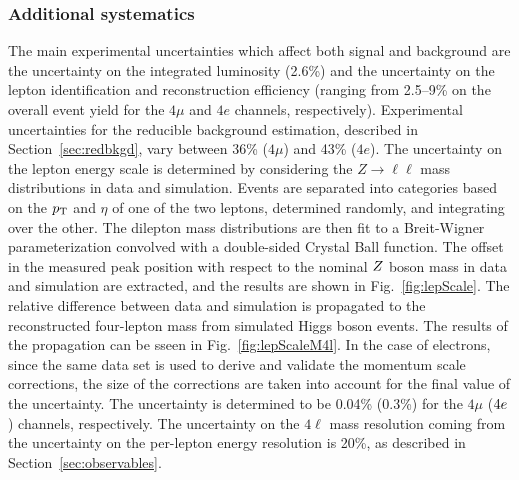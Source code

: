 \subsubsection{Additional systematics}

The main experimental uncertainties which affect both signal and background are the uncertainty on the integrated luminosity
(2.6\%) and the uncertainty on the lepton identification and reconstruction efficiency (ranging from 2.5--9\% on the 
overall event yield for the $4\mu$ 
and $4e$ channels, respectively). Experimental uncertainties for the reducible background estimation, 
described in Section~\ref{sec:redbkgd},
vary between 36\% ($4\mu$)  and 43\% ($4e$).  The uncertainty on the lepton energy scale is determined by considering the 
$Z\rightarrow\ell\ell$ mass distributions in data and simulation. Events are separated into categories based on the 
$p_{\rm{T}}$ and $\eta$ of one of the two leptons, determined randomly, and integrating over the other. The dilepton mass 
distributions are then fit to a Breit-Wigner 
parameterization convolved with a double-sided Crystal Ball function. The offset in the measured peak position with 
respect to the nominal $Z$ boson 
mass in data and simulation are extracted, and the results are shown in Fig.~\ref{fig:lepScale}. The relative difference 
between data and simulation is propagated to the reconstructed four-lepton mass 
from simulated Higgs boson events. The results of the propagation can be sseen in Fig.~\ref{fig:lepScaleM4l}.
In the case of electrons, since the same data set is used to derive and validate the 
momentum scale corrections, the size 
of the corrections are taken into account for the final value of the uncertainty.
The uncertainty is determined to be 0.04\% (0.3\%) for the  $4\mu$ ($4e$) channels, respectively. The uncertainty 
on the $4\ell$ mass resolution coming from the uncertainty on the per-lepton energy resolution is 20\%, 
as described in Section~\ref{sec:observables}.


